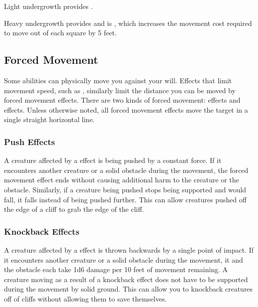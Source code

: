         \label{Light Undergrowth}
        Light undergrowth provides .

        \label{Heavy Undergrowth}
        Heavy undergrowth provides  and is , which increases the movement cost required to move out of each square by 5 feet.

    \subsection{Forced Movement}\label{Forced Movement}
        Some abilities can physically move you against your will.
        Effects that limit movement speed, such as , similarly limit the distance you can be moved by forced movement effects.
        There are two kinds of forced movement:  effects and  effects.
        Unless otherwise noted, all forced movement effects move the target in a single straight horizontal line.

        \subsubsection{Push Effects}\label{Push Effects}
            A creature affected by a  effect is being pushed by a constant force.
            If it encounters another creature or a solid obstacle during the movement, the forced movement effect ends without causing additional harm to the creature or the obstacle.
            Similarly, if a creature being pushed stops being supported and would fall, it falls instead of being pushed further.
            This can allow creatures pushed off the edge of a cliff to grab the edge of the cliff.

        \subsubsection{Knockback Effects}\label{Knockback Effects}
            A creature affected by a  effect is thrown backwards by a single point of impact.
            If it encounters another creature or a solid obstacle during the movement, it and the obstacle each take 1d6 damage per 10 feet of movement remaining.
            A creature moving as a result of a knockback effect does not have to be supported during the movement by solid ground.
            This can allow you to knockback creatures off of cliffs without allowing them to save themselves.

